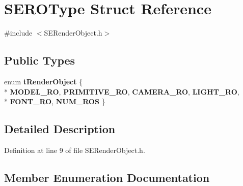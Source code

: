 \section{S\+E\+R\+O\+Type Struct Reference}
\label{struct_s_e_r_o_type}


{\ttfamily \#include $<$S\+E\+Render\+Object.\+h$>$}

\subsection*{Public Types}
\begin{DoxyCompactItemize}
\item 
enum {\bf t\+Render\+Object} \{ \\*
{\bf M\+O\+D\+E\+L\+\_\+\+R\+O}, 
{\bf P\+R\+I\+M\+I\+T\+I\+V\+E\+\_\+\+R\+O}, 
{\bf C\+A\+M\+E\+R\+A\+\_\+\+R\+O}, 
{\bf L\+I\+G\+H\+T\+\_\+\+R\+O}, 
\\*
{\bf F\+O\+N\+T\+\_\+\+R\+O}, 
{\bf N\+U\+M\+\_\+\+R\+O\+S}
 \}
\end{DoxyCompactItemize}


\subsection{Detailed Description}


Definition at line 9 of file S\+E\+Render\+Object.\+h.



\subsection{Member Enumeration Documentation}
